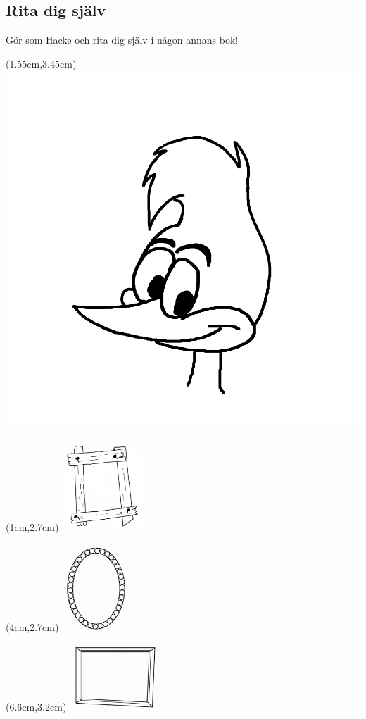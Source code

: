\noBackground


\newpage
\noBackground
\subsection*{Rita dig själv}

Gör som Hacke och rita dig själv i någon annans bok!

\begin{textblock*}{6cm}(1.55cm,3.45cm) %
  \includegraphics[width=2 cm]{./bilder/ramar/hacke_portratt_2.png} %
\end{textblock*}



\begin{textblock*}{6cm}(1cm,2.7cm) %
  \includegraphics[width=3cm]{./bilder/ramar/Ram4.png} %
\end{textblock*}

\begin{textblock*}{6cm}(4cm,2.7cm) %
  \includegraphics[width=2.6cm]{./bilder/ramar/Ram5.png} %
\end{textblock*}

\begin{textblock*}{6cm}(6.6cm,3.2cm) %
  \includegraphics[width=3.5cm]{./bilder/ramar/Ram6.png} %
\end{textblock*}



